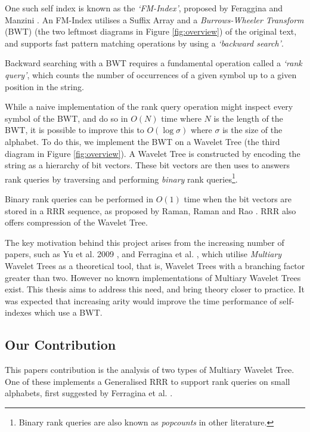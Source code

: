 One such self index is known as the \emph{`FM-Index'}, proposed by
Feraggina and Manzini \cite{fmindex:ferragina2000}. An FM-Index utilises a 
Suffix Array and a \emph{Burrows-Wheeler Transform} (BWT) (the two leftmost 
diagrams in Figure \ref{fig:overview}) of the original text, and supports fast 
pattern matching operations by using a \emph{`backward search'}.

Backward searching with a BWT requires a fundamental operation called a 
\emph{`rank query'}, which counts the number of occurrences of a given symbol up 
to a given position in the string.

While a naive implementation of the rank query operation might inspect every 
symbol of the BWT, and do so in $O(N)$ time where $N$ is the length of the BWT, 
it is possible to improve this to $O(\log \sigma)$ where $\sigma$ is the size of 
the alphabet. To do this, we implement the BWT on a Wavelet Tree (the third 
diagram in Figure 
\ref{fig:overview}). A Wavelet Tree is constructed by encoding the string as a 
hierarchy of bit vectors. These bit vectors are then uses to answers rank 
queries by traversing and performing \emph{binary} rank queries\footnote{ Binary rank queries are also known as \emph{popcounts} in other literature.}.

Binary rank queries can be performed in $O(1)$ time when the bit vectors are stored in
a RRR sequence, as proposed by Raman, Raman and Rao \cite{rrr2007}. RRR also 
offers compression of the Wavelet Tree.

The key motivation behind this project arises from the increasing number of
papers, such as Yu et al. 2009 \cite{yu2009}, and Ferragina et al. 
\cite{ferragina07}, which utilise \emph{Multiary} Wavelet Trees as a theoretical tool, that is, Wavelet Trees with a branching 
factor greater than two. However no known implementations of Multiary Wavelet 
Trees exist. This thesis aims to address this need, and bring theory closer to 
practice. It was expected that increasing arity would improve the time 
performance of self-indexes which use a BWT.


\subsection{Our Contribution}

This papers contribution is the analysis of two types of Multiary Wavelet Tree. 
One of these implements a Generalised RRR to support rank queries on small 
alphabets, first suggested by Ferragina et al. \cite{ferragina07}.

